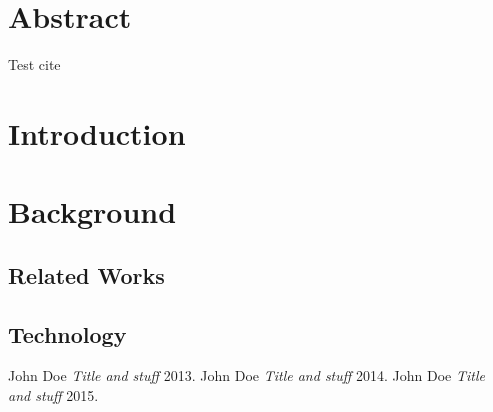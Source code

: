 \documentclass[10pt, a4paper, oneside]{article}
\title{\normalfont{Technical Report: Loren Ipsum}}
\author{{Alex Murphy}}
\begin{document}
\maketitle
\frenchspacing

\section*{Abstract} 

Test cite \cite{key1, key2, key3}  \lipsum[1] %

\section{Introduction}
 \lipsum[1] 
 
 \newpage
 \section{Background}
 \lipsum[1] 
 \subsection{Related Works}
 \lipsum[4]
 
 \subsection{Technology}
\lipsum[2-4]

\begin{thebibliography}{1}

 John Doe {\em Title and stuff}  2013.
 John Doe {\em Title and stuff}  2014.
 John Doe {\em Title and stuff}  2015.

\end{thebibliography}
\end{document}
